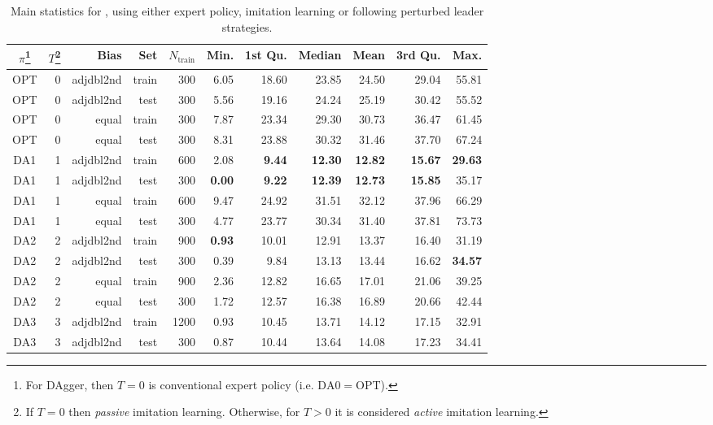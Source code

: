 \begin{table*}[t]    
\caption{Main statistics for  \namerho, using either expert
   policy, imitation learning or following perturbed leader 
   strategies.}\label{tbl:IL:stats} 
\noindent
\begin{minipage}{\textwidth}
\centering
\begin{tabular}{c@{}rrrrrrrrrr}
  \toprule
  $\pi$\footnote{For DAgger, then $T=0$ is conventional expert policy (i.e. 
  $\text{DA}0=\text{OPT}$).}
  & $T$\footnote{If $T=0$ then \emph{passive} imitation learning. 
  Otherwise, for $T>0$ it is considered \emph{active} imitation learning.}
  & Bias & Set & $N_{\text{train}}$ & Min. & 1st Qu. & Median & 
  Mean & 3rd Qu. & Max. \\ 
  \midrule  
  OPT & 0 & adjdbl2nd & train & 300 & 6.05 & 18.60 & 23.85 & 24.50 & 
  29.04 & 55.81 \\ 
  OPT & 0 & adjdbl2nd & test & 300 & 5.56 & 19.16 & 24.24 & 25.19 & 
  30.42 & 55.52 \\ 
  OPT & 0 & equal & train & 300 & 7.87 & 23.34 & 29.30 & 30.73 & 36.47 & 
  61.45 \\ 
  OPT & 0 & equal & test & 300 & 8.31 & 23.88 & 30.32 & 31.46 & 37.70 & 
  67.24 \\ 
  DA1 & 1 & adjdbl2nd & train & 600 & 2.08 & \textbf{9.44} & \textbf{12.30} & 
  \textbf{12.82} & \textbf{15.67} & \textbf{29.63} \\ 
  DA1 & 1 & adjdbl2nd & test & 300 & \textbf{0.00} & \textbf{9.22} & 
  \textbf{12.39} & \textbf{12.73} & \textbf{15.85} & 35.17 \\ 
  DA1 & 1 & equal & train & 600 & 9.47 & 24.92 & 31.51 & 32.12 & 37.96 & 
  66.29 \\ 
  DA1 & 1 & equal & test & 300 & 4.77 & 23.77 & 30.34 & 31.40 & 37.81 & 
  73.73 \\ 
  DA2 & 2 & adjdbl2nd & train & 900 & \textbf{0.93} & 10.01 & 12.91 & 13.37 & 
  16.40 & 31.19 \\ 
  DA2 & 2 & adjdbl2nd & test & 300 & 0.39 & 9.84 & 13.13 & 13.44 & 16.62 
  & \textbf{34.57} \\ 
  DA2 & 2 & equal & train & 900 & 2.36 & 12.82 & 16.65 & 17.01 & 21.06 & 
  39.25 \\ 
  DA2 & 2 & equal & test & 300 & 1.72 & 12.57 & 16.38 & 16.89 & 20.66 & 
  42.44 \\ 
  DA3 & 3 & adjdbl2nd & train & 1200 & 0.93 & 10.45 & 13.71 & 14.12 & 17.15 & 32.91 \\ 
  DA3 & 3 & adjdbl2nd & test & 300 & 0.87 & 10.44 & 13.64 & 14.08 & 17.23 & 34.41 \\ 

\end{tabular}
\end{minipage}
\end{table*}
